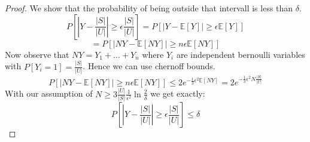 \begin{proof}
    We show that the probability of being outside that intervall is less than $\delta$.
    $$P\left[\left|Y - \frac{|S|}{|U|}\right| \geq \epsilon \frac{|S|}{|U|}\right] = P\left[\left|Y - \mathbb{E}[Y]\right| \geq \epsilon \mathbb{E}[Y]\right]$$
    $$ = P[|NY - \mathbb{E}[NY]| \geq n \epsilon \mathbb{E}[NY]]$$
    Now observe that $NY = Y_1 + \dots + Y_n$ where $Y_i$ are independent bernoulli variables with $P[Y_i=1] = \frac{|S|}{|U|}$. Hence we can use chernoff bounds.
    $$P[|NY - \mathbb{E}[NY]| \geq n \epsilon \mathbb{E}[NY]] \leq 2 e^{-\frac{1}{3} \epsilon^2 \mathbb{E}[NY]} =  2 e^{-\frac{1}{3} \epsilon^2 N \frac{|S|}{|U|}}$$
    With our assumption of $N \geq 3 \frac{|U|}{|S|} \frac{1}{\epsilon^2} \ln \frac{2}{\delta}$ we get exactly:
    $$P\left[\left|Y - \frac{|S|}{|U|}\right| \geq \epsilon \frac{|S|}{|U|}\right] \leq \delta$$
\end{proof}